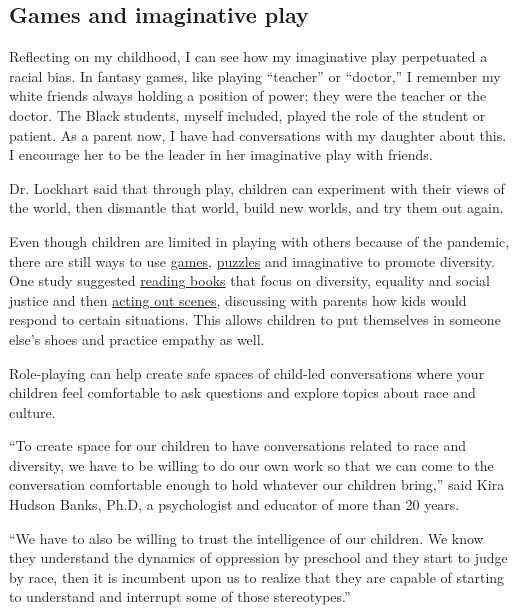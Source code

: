 \hypertarget{games-and-imaginative-play}{%
\subsection{Games and imaginative
play}\label{games-and-imaginative-play}}

Reflecting on my childhood, I can see how my imaginative play
perpetuated a racial bias. In fantasy games, like playing ``teacher'' or
``doctor,'' I remember my white friends always holding a position of
power; they were the teacher or the doctor. The Black students, myself
included, played the role of the student or patient. As a parent now, I
have had conversations with my daughter about this. I encourage her to
be the leader in her imaginative play with friends.

Dr. Lockhart said that through play, children can experiment with their
views of the world, then dismantle that world, build new worlds, and try
them out again.

Even though children are limited in playing with others because of the
pandemic, there are still ways to use
\href{https://www.browntoybox.com/shop/all/}{games},
\href{https://puzzlehuddle.com/}{puzzles} and imaginative to promote
diversity. One study suggested
\href{https://www.nytimes.com/2020/06/09/parenting/childrens-books-black-characters.html}{reading
books} that focus on diversity, equality and social justice and then
\href{https://pdfs.semanticscholar.org/33ff/b7ab64d021e34f5a1ec1ee975152e479f1d2.pdf}{acting
out scenes}, discussing with parents how kids would respond to certain
situations. This allows children to put themselves in someone else's
shoes and practice empathy as well.

Role-playing can help create safe spaces of child-led conversations
where your children feel comfortable to ask questions and explore topics
about race and culture.

``To create space for our children to have conversations related to race
and diversity, we have to be willing to do our own work so that we can
come to the conversation comfortable enough to hold whatever our
children bring,'' said Kira Hudson Banks, Ph.D, a psychologist and
educator of more than 20 years.

``We have to also be willing to trust the intelligence of our children.
We know they understand the dynamics of oppression by preschool and they
start to judge by race, then it is incumbent upon us to realize that
they are capable of starting to understand and interrupt some of those
stereotypes.''

